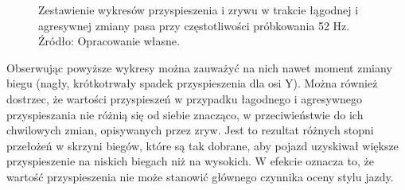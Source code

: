 \begin{figure}[H]
\centering
	\qquad
	
	\caption{Zestawienie wykresów przyspieszenia i zrywu w trakcie łągodnej i agresywnej zmiany pasa przy częstotliwości próbkowania 52 Hz.
	\\Źródło: Opracowanie własne.}
	\label{fig:image_driving_analysis_test_acc_light_hard_lane_52Hz}
\end{figure}


Obserwując powyższe wykresy można zauważyć na nich nawet moment zmiany biegu (nagły, krótkotrwały spadek przyspieszenia dla osi Y). Można również dostrzec, że wartości przyspieszeń w przypadku łagodnego i agresywnego przyspieszania nie różnią się od siebie znacząco, w przeciwieństwie do ich chwilowych zmian, opisywanych przez zryw. Jest to rezultat różnych stopni przełożeń w skrzyni biegów, które są tak dobrane, aby pojazd uzyskiwał większe przyspieszenie na niskich biegach niż na wysokich. W efekcie oznacza to, że wartość przyspieszenia nie może stanowić głównego czynnika oceny stylu jazdy.

